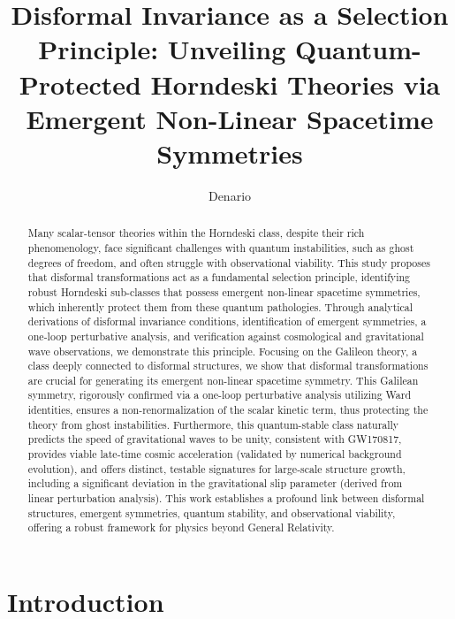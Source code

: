 \documentclass[twocolumn]{aastex631}
\begin{document}
\title{Disformal Invariance as a Selection Principle: Unveiling Quantum-Protected Horndeski Theories via Emergent Non-Linear Spacetime Symmetries}

\author{Denario}

\begin{abstract}
Many scalar-tensor theories within the Horndeski class, despite their rich phenomenology, face significant challenges with quantum instabilities, such as ghost degrees of freedom, and often struggle with observational viability. This study proposes that disformal transformations act as a fundamental selection principle, identifying robust Horndeski sub-classes that possess emergent non-linear spacetime symmetries, which inherently protect them from these quantum pathologies. Through analytical derivations of disformal invariance conditions, identification of emergent symmetries, a one-loop perturbative analysis, and verification against cosmological and gravitational wave observations, we demonstrate this principle. Focusing on the Galileon theory, a class deeply connected to disformal structures, we show that disformal transformations are crucial for generating its emergent non-linear spacetime symmetry. This Galilean symmetry, rigorously confirmed via a one-loop perturbative analysis utilizing Ward identities, ensures a non-renormalization of the scalar kinetic term, thus protecting the theory from ghost instabilities. Furthermore, this quantum-stable class naturally predicts the speed of gravitational waves to be unity, consistent with GW170817, provides viable late-time cosmic acceleration (validated by numerical background evolution), and offers distinct, testable signatures for large-scale structure growth, including a significant deviation in the gravitational slip parameter (derived from linear perturbation analysis). This work establishes a profound link between disformal structures, emergent symmetries, quantum stability, and observational viability, offering a robust framework for physics beyond General Relativity.
\end{abstract}



\section{Introduction}
\label{sec:intro}
\end{document}
